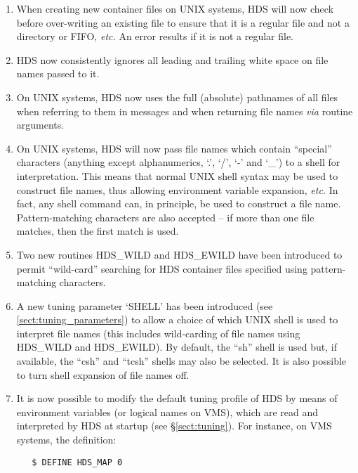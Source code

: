 \begin{enumerate}
\item
When creating new container files on UNIX systems, HDS will now check before
over-writing an existing file to ensure that it is a regular file and not a
directory or FIFO, {\em etc.} An error results if it is not a regular file.

\item
HDS now consistently ignores all leading and trailing white space on file names
passed to it.

\item
On UNIX systems, HDS now uses the full (absolute) pathnames of all files when
referring to them in messages and when returning file names {\em via} routine
arguments.

\item
On UNIX systems, HDS will now pass file names which contain ``special''
characters (anything except alphanumerics, `.', `/', `-' and `\_') to a shell
for interpretation. This means that normal UNIX shell syntax may be used to
construct file names, thus allowing environment variable expansion, {\em etc.}
In fact, any shell command can, in principle, be used to construct a file name.
Pattern-matching characters are also accepted -- if more than one file matches,
then the first match is used.

\item
Two new routines HDS\_WILD and HDS\_EWILD have been introduced to permit
``wild-card'' searching for HDS container files specified using pattern-matching
characters.

\item
A new tuning parameter `SHELL' has been introduced (see
\ref{sect:tuning_parameters}) to allow a choice of which UNIX shell is used to
interpret file names (this includes wild-carding of file names using HDS\_WILD
and HDS\_EWILD). By default, the ``sh'' shell is used but, if available, the
``csh'' and ``tcsh'' shells may also be selected. It is also possible to turn
shell expansion of file names off.

\item
It is now possible to modify the default tuning profile of HDS by means of
environment variables (or logical names on VMS), which are read and interpreted
by HDS at startup (see \S\ref{sect:tuning}). For instance, on VMS systems, the
definition:

\small
\begin{verbatim}
   $ DEFINE HDS_MAP 0
\end{verbatim}
\normalsize


\end{enumerate}
